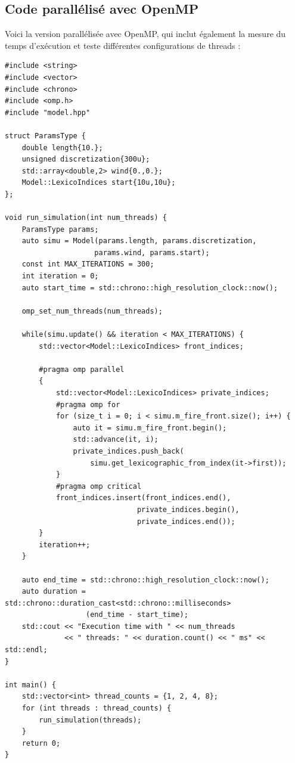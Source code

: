 \documentclass[a4paper,12pt]{article}
\begin{document}
\subsection{Code parallélisé avec OpenMP}
Voici la version parallélisée avec OpenMP, qui inclut également la mesure du temps d'exécution et teste différentes configurations de threads :

\begin{lstlisting}
#include <string>
#include <vector>
#include <chrono>
#include <omp.h>
#include "model.hpp"

struct ParamsType {
    double length{10.};
    unsigned discretization{300u};
    std::array<double,2> wind{0.,0.};
    Model::LexicoIndices start{10u,10u};
};

void run_simulation(int num_threads) {
    ParamsType params;
    auto simu = Model(params.length, params.discretization, 
                     params.wind, params.start);
    const int MAX_ITERATIONS = 300;
    int iteration = 0;
    auto start_time = std::chrono::high_resolution_clock::now();
    
    omp_set_num_threads(num_threads);
    
    while(simu.update() && iteration < MAX_ITERATIONS) {
        std::vector<Model::LexicoIndices> front_indices;
        
        #pragma omp parallel
        {
            std::vector<Model::LexicoIndices> private_indices;
            #pragma omp for
            for (size_t i = 0; i < simu.m_fire_front.size(); i++) {
                auto it = simu.m_fire_front.begin();
                std::advance(it, i);
                private_indices.push_back(
                    simu.get_lexicographic_from_index(it->first));
            }
            #pragma omp critical
            front_indices.insert(front_indices.end(), 
                               private_indices.begin(), 
                               private_indices.end());
        }
        iteration++;
    }
    
    auto end_time = std::chrono::high_resolution_clock::now();
    auto duration = std::chrono::duration_cast<std::chrono::milliseconds>
                   (end_time - start_time);
    std::cout << "Execution time with " << num_threads 
              << " threads: " << duration.count() << " ms" << std::endl;
}

int main() {
    std::vector<int> thread_counts = {1, 2, 4, 8};
    for (int threads : thread_counts) {
        run_simulation(threads);
    }
    return 0;
}
\end{lstlisting}
\end{document}
